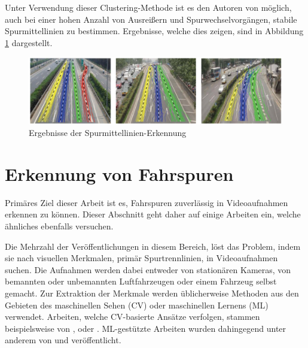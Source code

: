 Unter Verwendung dieser Clustering-Methode ist es den Autoren von \cite[]{Ren2014} möglich, auch bei einer hohen Anzahl von
Ausreißern und Spurwechselvorgängen, stabile Spurmittellinien zu bestimmen. Ergebnisse, welche dies zeigen, sind in Abbildung
\ref{fig:relw_ren_example_detection} dargestellt.

\begin{figure}[H]
    \centering
    \includegraphics[width=0.9\linewidth]{../resources/img/RelatedWork/ren_examples_detection}
    \caption[Ergebnisse der Spurmittellinien-Erkennung (Ren et al.)]{Ergebnisse der Spurmittellinien-Erkennung \cite[]{Ren2014}}
    \label{fig:relw_ren_example_detection}
\end{figure}


\section{Erkennung von Fahrspuren}
\label{sec:rw_lane_detection}

Primäres Ziel dieser Arbeit ist es, Fahrspuren zuverlässig in Videoaufnahmen erkennen zu können. Dieser Abschnitt
geht daher auf einige Arbeiten ein, welche ähnliches ebenfalls versuchen.

Die Mehrzahl der Veröffentlichungen in diesem Bereich, löst das Problem, indem sie nach visuellen Merkmalen,
primär Spurtrennlinien, in Videoaufnahmen suchen. Die Aufnahmen werden dabei entweder von stationären Kameras,
von bemannten oder unbemannten Luftfahrzeugen oder einem Fahrzeug selbst gemacht. Zur Extraktion der Merkmale werden
üblicherweise Methoden aus den Gebieten des maschinellen Sehen (CV) oder maschinellen Lernens (ML) verwendet. %
Arbeiten, welche CV-basierte Ansätze verfolgen, stammen beispielsweise von \cite[]{Lai2000}, \cite[]{McCall2006} oder \cite[]{Aly2008}.
ML-gestützte Arbeiten wurden dahingegend unter anderem von \cite[]{Kim2008} und \cite[]{Gopalan2012} veröffentlicht.

